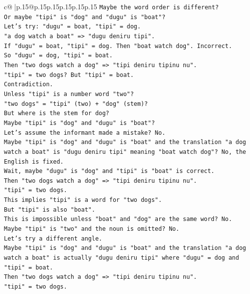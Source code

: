 \documentclass{article}
\begin{document}
{\begin{supertabular}{c@{$\;$}|p{.15\linewidth}@{}p{.15\linewidth}p{.15\linewidth}p{.15\linewidth}p{.15\linewidth}p{.15\linewidth}}
{{{\texttt{Maybe the word order is different?} \\
\texttt{Or maybe "tipi" is "dog" and "dugu" is "boat"?} \\
\texttt{Let's try: "dugu" = boat, "tipi" = dog.} \\
\texttt{"a dog watch a boat" => "dugu deniru tipi".} \\
\texttt{If "dugu" = boat, "tipi" = dog. Then "boat watch dog". Incorrect.} \\
\texttt{So "dugu" = dog, "tipi" = boat.} \\
\texttt{Then "two dogs watch a dog" => "tipi deniru tipinu nu".} \\
\texttt{"tipi" = two dogs? But "tipi" = boat.} \\
\texttt{Contradiction.} \\
\texttt{Unless "tipi" is a number word "two"?} \\
\texttt{"two dogs" = "tipi" (two) + "dog" (stem)?} \\
\texttt{But where is the stem for dog?} \\
\texttt{Maybe "tipi" is "dog" and "dugu" is "boat"?} \\
\texttt{Let's assume the informant made a mistake? No.} \\
\texttt{Maybe "tipi" is "dog" and "dugu" is "boat" and the translation "a dog watch a boat" is "dugu deniru tipi" meaning "boat watch dog"? No, the English is fixed.} \\
\texttt{Wait, maybe "dugu" is "dog" and "tipi" is "boat" is correct.} \\
\texttt{Then "two dogs watch a dog" => "tipi deniru tipinu nu".} \\
\texttt{"tipi" = two dogs.} \\
\texttt{This implies "tipi" is a word for "two dogs".} \\
\texttt{But "tipi" is also "boat".} \\
\texttt{This is impossible unless "boat" and "dog" are the same word? No.} \\
\texttt{Maybe "tipi" is "two" and the noun is omitted? No.} \\
\texttt{Let's try a different angle.} \\
\texttt{Maybe "tipi" is "dog" and "dugu" is "boat" and the translation "a dog watch a boat" is actually "dugu deniru tipi" where "dugu" = dog and "tipi" = boat.} \\
\texttt{Then "two dogs watch a dog" => "tipi deniru tipinu nu".} \\
\texttt{"tipi" = two dogs.} \\
}}}
\end{supertabular}}
\end{document}
